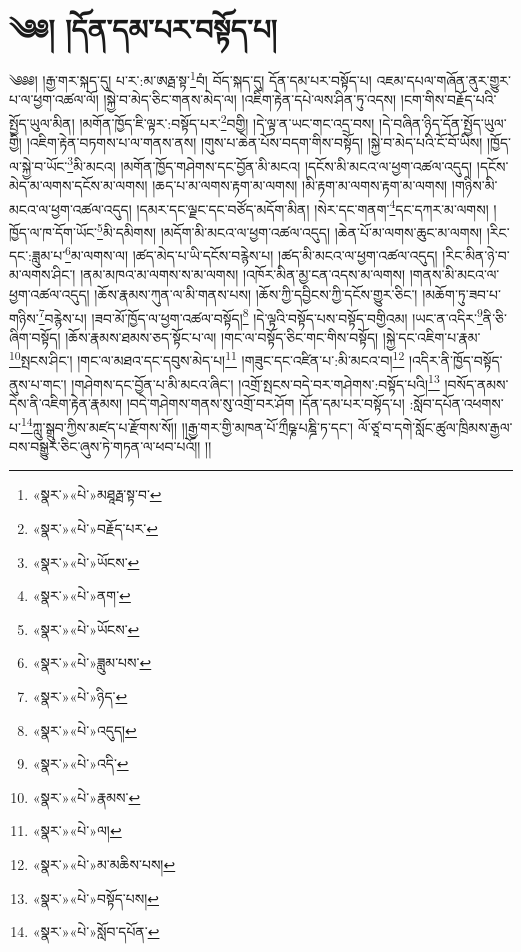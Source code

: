\chapter{༄༅། །དོན་དམ་པར་བསྟོད་པ།}༄༅༅། །རྒྱ་གར་སྐད་དུ། པ་ར་:མ་ཨརྠ་སྟ་\footnote{«སྣར་»«པེ་»མཐཱརྠ་སྟ་བ་}བཾ། བོད་སྐད་དུ། དོན་དམ་པར་བསྟོད་པ། འཇམ་དཔལ་གཞོན་ནུར་གྱུར་པ་ལ་ཕྱག་འཚལ་ལོ། །སྐྱེ་བ་མེད་ཅིང་གནས་མེད་ལ། །འཇིག་རྟེན་དཔེ་ལས་ཤིན་ཏུ་འདས། །ངག་གིས་བརྗོད་པའི་སྤྱོད་ཡུལ་མིན། །མགོན་ཁྱོད་ཇི་ལྟར་:བསྟོད་པར་\footnote{«སྣར་»«པེ་»བརྗོད་པར་}བགྱི། །དེ་ལྟ་ན་ཡང་གང་འདྲ་བས། །དེ་བཞིན་ཉིད་དོན་སྤྱོད་ཡུལ་གྱི། །འཇིག་རྟེན་བཏགས་པ་ལ་གནས་ནས། །གུས་པ་ཆེན་པོས་བདག་གིས་བསྟོད། །སྐྱེ་བ་མེད་པའི་ངོ་བོ་ཡིས། །ཁྱོད་ལ་སྐྱེ་བ་ཡོང་\footnote{«སྣར་»«པེ་»ཡོངས་}མི་མངའ། །མགོན་ཁྱོད་གཤེགས་དང་བྱོན་མི་མངའ། །དངོས་མི་མངའ་ལ་ཕྱག་འཚལ་འདུད། །དངོས་མེད་མ་ལགས་དངོས་མ་ལགས། །ཆད་པ་མ་ལགས་རྟག་མ་ལགས། །མི་རྟག་མ་ལགས་རྟག་མ་ལགས། །གཉིས་མི་མངའ་ལ་ཕྱག་འཚལ་འདུད། །དམར་དང་ལྗང་དང་བཙོད་མདོག་མིན། །སེར་དང་གནག་\footnote{«སྣར་»«པེ་»ནག་}དང་དཀར་མ་ལགས། །ཁྱོད་ལ་ཁ་དོག་ཡོང་\footnote{«སྣར་»«པེ་»ཡོངས་}མི་དམིགས། །མདོག་མི་མངའ་ལ་ཕྱག་འཚལ་འདུད། །ཆེན་པོ་མ་ལགས་ཆུང་མ་ལགས། །རིང་དང་:ཟླུམ་པ་\footnote{«སྣར་»«པེ་»ཟླུམ་པས་}མ་ལགས་ལ། །ཚད་མེད་པ་ཡི་དངོས་བརྙེས་པ། །ཚད་མི་མངའ་ལ་ཕྱག་འཚལ་འདུད། །རིང་མིན་ཉེ་བ་མ་ལགས་ཤིང་། །ནམ་མཁའ་མ་ལགས་ས་མ་ལགས། །འཁོར་མིན་མྱ་ངན་འདས་མ་ལགས། །གནས་མི་མངའ་ལ་ཕྱག་འཚལ་འདུད། །ཆོས་རྣམས་ཀུན་ལ་མི་གནས་པས། །ཆོས་ཀྱི་དབྱིངས་ཀྱི་དངོས་གྱུར་ཅིང་། །མཆོག་ཏུ་ཟབ་པ་གཉིས་\footnote{«སྣར་»«པེ་»ཉིད་}བརྙེས་པ། །ཟབ་མོ་ཁྱོད་ལ་ཕྱག་འཚལ་བསྟོད།\footnote{«སྣར་»«པེ་»འདུད།} །དེ་ལྟའི་བསྟོད་པས་བསྟོད་བགྱིའམ། །ཡང་ན་འདིར་\footnote{«སྣར་»«པེ་»འདི་}ནི་ཅི་ཞིག་བསྟོད། །ཆོས་རྣམས་ཐམས་ཅད་སྟོང་པ་ལ། །གང་ལ་བསྟོད་ཅིང་གང་གིས་བསྟོད། །སྐྱེ་དང་འཇིག་པ་རྣམ་\footnote{«སྣར་»«པེ་»རྣམས་}སྤངས་ཤིང་། །གང་ལ་མཐའ་དང་དབུས་མེད་པ།\footnote{«སྣར་»«པེ་»ལ།} །གཟུང་དང་འཛིན་པ་:མི་མངའ་བ།\footnote{«སྣར་»«པེ་»མ་མཆིས་པས།} །འདིར་ནི་ཁྱོད་བསྟོད་ནུས་པ་གང་། །གཤེགས་དང་བྱོན་པ་མི་མངའ་ཞིང་། །འགྲོ་སྤངས་བདེ་བར་གཤེགས་:བསྟོད་པའི།\footnote{«སྣར་»«པེ་»བསྟོད་པས།} །བསོད་ནམས་དེས་ནི་འཇིག་རྟེན་རྣམས། །བདེ་གཤེགས་གནས་སུ་འགྲོ་བར་ཤོག །དོན་དམ་པར་བསྟོད་པ། :སློབ་དཔོན་འཕགས་པ་\footnote{«སྣར་»«པེ་»སློབ་དཔོན་}ཀླུ་སྒྲུབ་ཀྱིས་མཛད་པ་རྫོགས་སོ།། །།རྒྱ་གར་གྱི་མཁན་པོ་ཀྲྀཥྞ་པཎྜི་ཏ་དང་། ལོ་ཙཱ་བ་དགེ་སློང་ཚུལ་ཁྲིམས་རྒྱལ་བས་བསྒྱུར་ཅིང་ཞུས་ཏེ་གཏན་ལ་ཕབ་པའོ།། །།